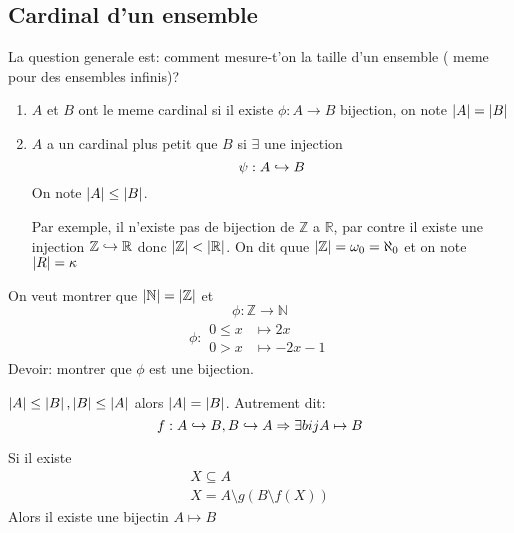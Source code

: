\documentclass[../main.tex]{subfiles}
\begin{document}
\subsection{Cardinal d'un ensemble}
La question generale est: comment mesure-t'on la taille d'un ensemble ( meme pour des ensembles infinis)?\\
\begin{defn}\label{defn:cardinal_d_un_ensemble}
	\begin{enumerate}
		\item $A$ et  $B$ ont le meme cardinal si il existe $\phi: A \to B$ bijection, on note $\left\vert A\right\vert = \left\vert B\right\vert$\\
		\item $A$ a un cardinal plus petit que $B$ si $\exists$ une injection 
			\[ 
			\psi: A \hookrightarrow B
			\]
			On note $\left\vert A\right\vert \leq \left\vert B\right\vert$.

			Par exemple, il n'existe pas de bijection de $\mathbb{Z}$ a $\mathbb{R}$, par contre il existe une injection $\mathbb{Z} \hookrightarrow \mathbb{R}$ donc $\left\vert\mathbb{Z}\right\vert < \left\vert\mathbb{R}\right\vert$. On dit quue $\left\vert\mathbb{Z}\right\vert = \omega_0 = \aleph_0$ et on note $\left\vert R\right\vert= \kappa$
	\end{enumerate}
\end{defn}
\begin{exemple}
	On veut montrer que $\left\vert\mathbb{N}\right\vert = \left\vert\mathbb{Z}\right\vert$ et 
	\[ 
		\phi: \mathbb{Z} \to \mathbb{N}
	\]
	\begin{align*}
	\phi :
	\begin{aligned}
		0 \leq x &\mapsto 2x\\
	0>x &\mapsto -2x-1
	\end{aligned}
	\end{align*}
	Devoir: montrer que $\phi$ est une bijection.
\end{exemple}
\begin{thm}
	$\left\vert A\right\vert \leq \left\vert B\right\vert, \left\vert B\right\vert \leq \left\vert A\right\vert$ alors $\left\vert A\right\vert = \left\vert B\right\vert$.
	Autrement dit:
	\[ 
	f: A \hookrightarrow B, B \hookrightarrow A \Rightarrow \exists bij A \mapsto B
	\]
	
\end{thm}
\begin{lemma}
	
	Si il existe
	\begin{align*}
	X \subseteq A\\
	X = A \setminus g(B\setminus f(X))
	\end{align*}
	Alors il existe une bijectin $A \mapsto B$
\end{lemma}
\end{document}
